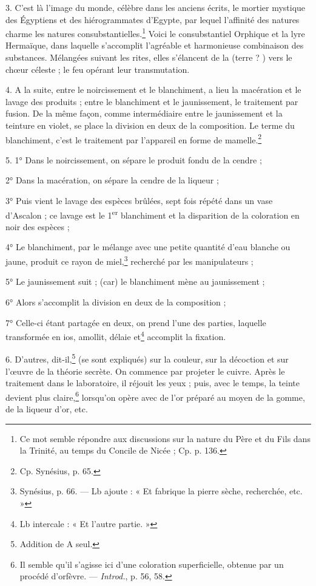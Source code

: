 \documentclass[a4paper, 11pt, oneside, polutonikogreek, french]{article}
\begin{document}
3. C'est là l'image du monde, célèbre dans les anciens écrits, le mortier mystique des Égyptiens et des hiérogrammates d'Egypte, par lequel l'affinité des natures charme les natures consubstantielles.\footnote{Ce mot semble répondre aux discussions sur la nature du Père et du Fils dans la Trinité, au temps du Concile de Nicée ; Cp. p. 136.} Voici le consubstantiel Orphique et la lyre Hermaïque, dans laquelle s'accomplit l'agréable et harmonieuse combinaison des substances. Mélangées suivant les rites, elles s'élancent de la (terre ? ) vers le chœur céleste ; le feu opérant leur transmutation.

4. A la suite, entre le noircissement et le blanchiment, a lieu la macération et le lavage des produits ; entre le blanchiment et le jaunissement, le traitement par fusion. De la même façon, comme intermédiaire entre le jaunissement et la teinture en violet, se place la division en deux de la composition. Le terme du blanchiment, c'est le traitement par l'appareil en forme de mamelle.\footnote{Cp. Synésius, p. 65.}

5. 1° Dans le noircissement, on sépare le produit fondu de la cendre ;

2° Dans la macération, on sépare la cendre de la liqueur ;

3° Puis vient le lavage des espèces brûlées, sept fois répété dans un vase d'Ascalon ; ce lavage est le 1\textsuperscript{er} blanchiment et la disparition de la coloration en noir des espèces ;

4° Le blanchiment, par le mélange avec une petite quantité d'eau blanche ou jaune, produit ce rayon de miel,\footnote{Synésius, p. 66. --- Lb ajoute : « Et fabrique la pierre sèche, recherchée, etc. »} recherché par les manipulateurs ;

5° Le jaunissement suit ; (car) le blanchiment mène au jaunissement ;

6° Alors s'accomplit la division en deux de la composition ;

7° Celle-ci étant partagée en deux, on prend l'une des parties, laquelle transformée en ios, amollit, délaie et\footnote{Lb intercale : « Et l'autre partie. »} accomplit la fixation.

6. D'autres, dit-il,\footnote{Addition de A seul.} (se sont expliqués) sur la couleur, sur la décoction et sur l'œuvre de la théorie secrète. On commence par projeter le cuivre. Après le traitement dans le laboratoire, il réjouit les yeux ; puis, avec le temps, la teinte devient plus claire,\footnote{Il semble qu'il s'agisse ici d'une coloration superficielle, obtenue par un procédé d'orfèvre. --- \emph{Introd.}, p. 56, 58.} lorsqu'on opère avec de l'or préparé au moyen de la gomme, de la liqueur d'or, etc.
\end{document}
